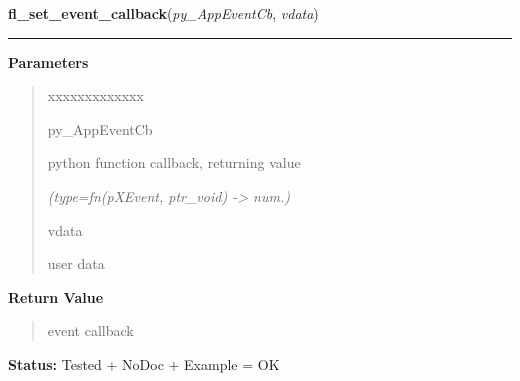     \label{xformslib:library:fl_set_event_callback}

    \vspace{0.5ex}

\hspace{.8\funcindent}\begin{boxedminipage}{\funcwidth}

    \raggedright \textbf{fl\_set\_event\_callback}(\textit{py\_AppEventCb}, \textit{vdata})

    \vspace{-1.5ex}

    \rule{\textwidth}{0.5\fboxrule}
\setlength{\parskip}{2ex}
\setlength{\parskip}{1ex}
      \textbf{Parameters}
      \vspace{-1ex}

      \begin{quote}
        \begin{Ventry}{xxxxxxxxxxxxx}

          \item[py\_AppEventCb]

          python function callback, returning value

            {\it (type=fn(pXEvent, ptr\_void) -{\textgreater} num.)}

          \item[vdata]

          user data

        \end{Ventry}

      \end{quote}

      \textbf{Return Value}
    \vspace{-1ex}

      \begin{quote}
      event callback

      \end{quote}

\textbf{Status:} Tested + NoDoc + Example = OK



    \end{boxedminipage}

    \label{xformslib:library:fl_set_idle_callback}

